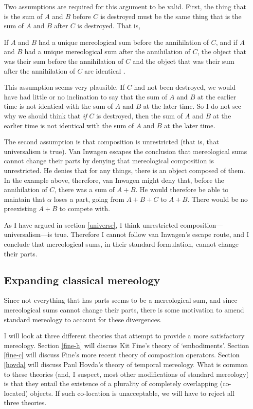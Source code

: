 \documentclass[11pt]{article}
\newenvironment{squote}{%
\begin{spacing}{1}
\begin{list}{}{%
\setlength{\labelwidth}{0pt}%
\rightmargin\leftmargin%
}
\item\relax
}{%
\end{list}%
\end{spacing}
}
\begin{document}
\begin{spacing}{1.5}
Two assumptions are required for this argument to be valid.  First,
the thing that is the sum of $A$ and $B$ before $C$ is destroyed must
be the same thing that is the sum of $A$ and $B$ after $C$ is
destroyed.  That is,

\begin{squote}
If $A$ and $B$ had a unique mereological sum before the annihilation
of $C$, and if $A$ and $B$ had a unique mereological sum after the
annihilation of $C$, the object that was their sum before the
annihilation of $C$ and the object that was their sum after the
annihilation of $C$ are identical \citep[629]{inwagen2006}.
\end{squote}

This assumption seems very plausible.  If $C$ had not been destroyed,
we would have had little or no inclination to say that the sum of $A$
and $B$ at the earlier time is not identical with the sum of $A$ and
$B$ at the later time.  So I do not see why we should think that {\em
  if} $C$ is destroyed, then the sum of $A$ and $B$ at the earlier
time is not identical with the sum of $A$ and $B$ at the later time.

The second assumption is that composition is unrestricted (that is,
that universalism is true).  Van Inwagen escapes the conclusion that
mereological sums cannot change their parts by denying that
mereological composition is unrestricted.  He denies that for any
things, there is an object composed of them.  In the example above,
therefore, van Inwagen might deny that, before the annihilation of
$C$, there was a sum of $A + B$.  He would therefore be able to
maintain that $\alpha$ loses a part, going from $A + B + C$ to $A +
B$.  There would be no preexisting $A + B$ to compete with.

As I have argued in section \ref{universe}, I think unrestricted
composition---universalism---is true.  Therefore I cannot follow van
Inwagen's escape route, and I conclude that mereological sums, in
their standard formulation, cannot change their parts.

\subsection{Expanding classical mereology}
\label{expand}
Since not everything that has parts seems to be a mereological sum,
and since mereological sums cannot change their parts, there is some
motivation to amend standard mereology to account for these
divergences.

I will look at three different theories that attempt to provide a more
satisfactory mereology.  Section \ref{fine-h} will discuss Kit Fine's
theory of `embodiments'.  Section \ref{fine-c} will discuss Fine's
more recent theory of composition operators.  Section \ref{hovda} will
discuss Paul Hovda's theory of temporal mereology.  What is common to
these theories (and, I suspect, most other modifications of standard
mereology) is that they entail the existence of a plurality of
completely overlapping (co-located) objects.  If such co-location is
unacceptable, we will have to reject all three theories.


\end{spacing}
\end{document}
